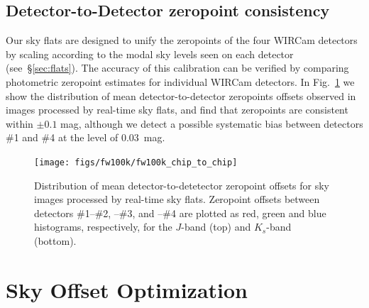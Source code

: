\documentclass[iop]{emulateapj}
\newcommand{\mycomment}[1]{\textcolor{OliveGreen}{\textit{#1}}} %
\newcommand{\Fig}[1]{Fig.~\ref{fig:#1}}  %
\newcommand{\Sec}[1]{\S\ref{sec:#1}}  %
\begin{document}
\subsection{Detector-to-Detector zeropoint consistency}
\label{sec:detector_zp}

Our sky flats are designed to unify the zeropoints of the four WIRCam detectors by scaling according to the modal sky levels seen on each detector (see~\Sec{flats}).
The accuracy of this calibration can be verified by comparing photometric zeropoint estimates for individual WIRCam detectors.
In \Fig{fw100k_chip_to_chip} we show the distribution of mean detector-to-detector zeropoints offsets observed in images processed by real-time sky flats, and find that zeropoints are consistent within $\pm 0.1$ mag, although we detect a possible systematic bias between detectors \#1 and \#4 at the level of $0.03$~mag.

\begin{figure}[t]
\centering
\texttt{[image: figs/fw100k/fw100k\_chip\_to\_chip]}
\caption{Distribution of mean detector-to-detetector zeropoint offsets for sky images processed by real-time sky flats. Zeropoint offsets between detectors \#1--\#2, --\#3, and --\#4 are plotted as
red, green and blue histograms, respectively, for the $J$-band (top) and $K_s$-band (bottom).}
\label{fig:fw100k_chip_to_chip}
\end{figure}

\section{Sky Offset Optimization}
\label{sec:scalar}
\end{document}
